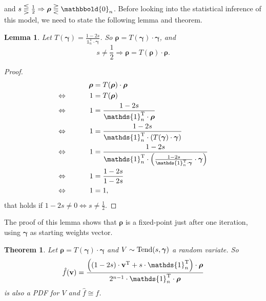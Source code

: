 \documentclass{article}
\newtheorem{theorem}{Theorem}
\newtheorem{lemma}{Lemma}
\newcommand{\0}{\mathbbold{0}}
\newcommand{\1}{\mathds{1}}
\newcommand{\2}{\mathbbold{2}}
\newcommand{\T}{^{\operatorname{T}}}
\newcommand{\LRA}{\Leftrightarrow\mkern40mu}
\begin{document}
and $s \lesseqqgtr \frac{1}{2} \Rightarrow {\boldsymbol \rho} \gtreqqless \0_n$. 
Before looking into the statistical inference of this model, we need to state the following lemma and theorem.
\begin{lemma} \label{lemma1}
    Let $T({\boldsymbol \gamma}) = \frac{1-2s}{\1_n\T\cdot {\boldsymbol \gamma}}$. So ${\boldsymbol \rho} = T({\boldsymbol \gamma})\cdot {\boldsymbol \gamma}$, and
    \begin{equation*}
        s \ne \frac{1}{2} \Rightarrow {\boldsymbol \rho} = T({\boldsymbol \rho}) \cdot {\boldsymbol \rho}.
    \end{equation*}
\end{lemma}
\begin{proof}
    \begin{alignat*}{2}
        && {\boldsymbol \rho} &= T({\boldsymbol \rho}) \cdot {\boldsymbol \rho} \\
        \LRA && 1 &= T({\boldsymbol \rho}) \\
        \LRA && 1 &= \frac{1-2s}{\1_n\T\cdot {\boldsymbol \rho}} \\
        \LRA && 1 &= \frac{1-2s}{\1_n\T\cdot \left(T({\boldsymbol \gamma})\cdot {\boldsymbol \gamma}\right) } \\
        \LRA && 1 &= \frac{1-2s}{\1_n\T\cdot \left(\frac{1-2s}{\1_n\T\cdot {\boldsymbol \gamma}}\cdot {\boldsymbol \gamma}\right) } \\
        \LRA && 1 &= \frac{1-2s}{1-2s} \\
        \LRA && 1 &= 1,
    \end{alignat*}
    that holds if $1-2s \ne 0 \Leftrightarrow s \ne \frac{1}{2}$.
\end{proof}
The proof of this lemma shows that ${\boldsymbol \rho}$ is a fixed-point just after one iteration, using ${\boldsymbol \gamma}$ as starting weights vector.
\begin{theorem}
    Let ${\boldsymbol \rho} = T({\boldsymbol \gamma})\cdot {\boldsymbol \gamma}$ and $V \sim \textup{Tend}(s, {\boldsymbol \gamma})$ a random variate. So
    \begin{equation*}
        \hat{f}({\bf v}) = \frac{\left(\left(1-2s\right) \cdot {\bf v}\T + s\cdot\1_n\T\right) \cdot {\boldsymbol \rho}}{2^{n-1}\cdot \1_n\T \cdot {\boldsymbol \rho}}
    \end{equation*}
    is also a PDF for $V$ and $\hat{f} \cong f$.
\end{theorem}
\end{document}
